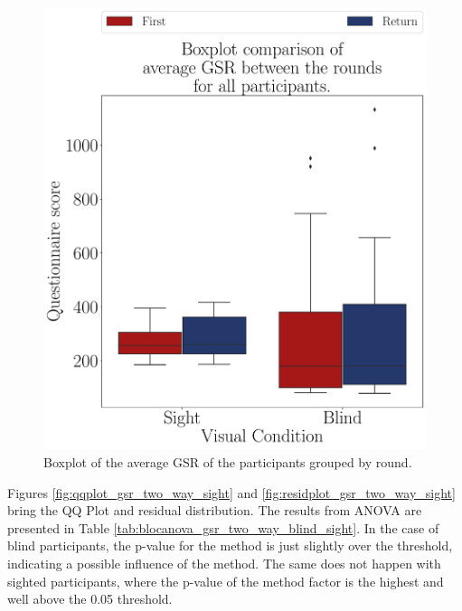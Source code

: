 \begin{figure}[!htb]
\begin{minipage}{0.45\textwidth}
        \includegraphics[width = \textwidth]{Resultados/GSR/Figuras/pdf/boxplot_gsr_avg_4_rounds.pdf}
        \caption{Boxplot of the average GSR of the participants grouped by round.}
        \label{fig:boxplot_gsr_avg_4_rounds}
    \end{minipage}
\end{figure}

Figures \ref{fig:qqplot_gsr_two_way_sight} and \ref{fig:residplot_gsr_two_way_sight} bring the QQ Plot and residual distribution. The results from ANOVA are presented in Table \ref{tab:blocanova_gsr_two_way_blind_sight}. In the case of blind participants, the p-value for the method is just slightly over the threshold, indicating a possible influence of the method. The same does not happen with sighted participants, where the p-value of the method factor is the highest and well above the 0.05 threshold.
 
%
%

